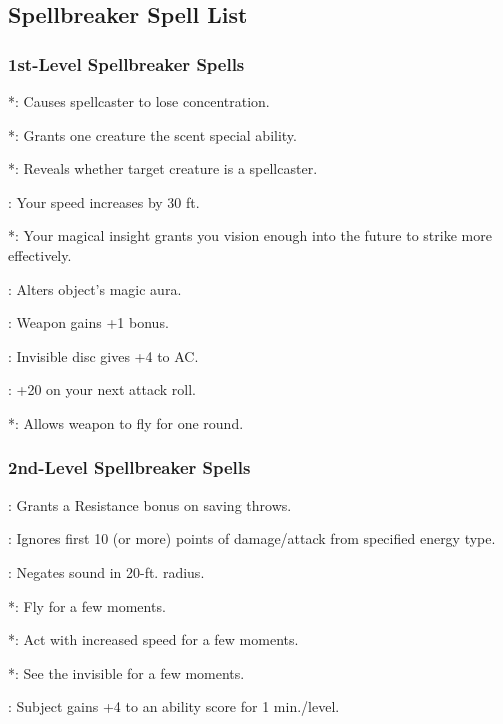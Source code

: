 \subsection{Spellbreaker Spell List}
\subsubsection{1st-Level Spellbreaker Spells}
\begin{list}{}{\leftmargin=1em}
  \item {}*: Causes spellcaster to lose concentration.
  \item {}*: Grants one creature the scent special ability.
  \item {}*: Reveals whether target creature is a spellcaster.
  \item {}: Your speed increases by 30 ft.
  \item {}*: Your magical insight grants you vision enough into the future to strike more effectively.
  \item {}: Alters object's magic aura.
  \item {}: Weapon gains +1 bonus.
  \item {}: Invisible disc gives +4 to AC.
  \item {}: +20 on your next attack roll.
  \item {}*: Allows weapon to fly for one round.
\end{list}
\subsubsection{2nd-Level Spellbreaker Spells}
\begin{list}{}{\leftmargin=1em}
  \item {} : Grants a Resistance bonus on saving throws.
  \item {}: Ignores first 10 (or more) points of damage/attack from specified energy type.
  \item {}: Negates sound in 20-ft. radius.
  \item {}*: Fly for a few moments.
  \item {}*: Act with increased speed for a few moments.
  \item {}*: See the invisible for a few moments.
  \item {}: Subject gains +4 to an ability score for 1 min./level.
\end{list}
